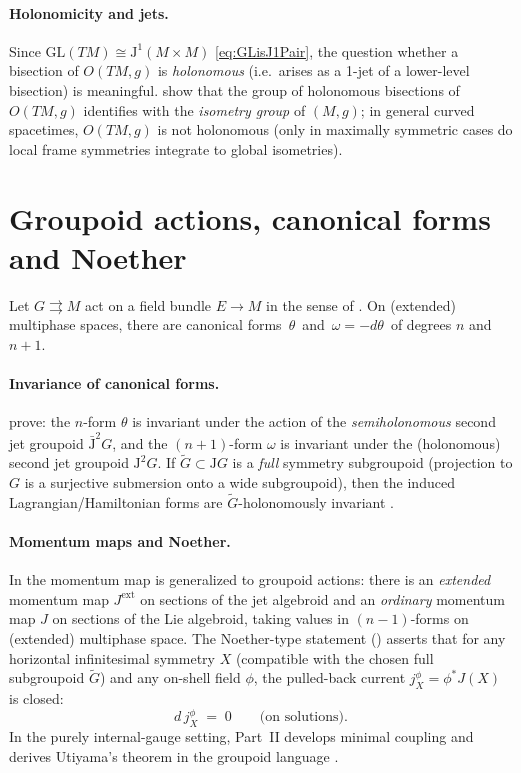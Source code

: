 \documentclass[11pt]{article}
\newcommand{\GL}{\mathrm{GL}}
\newcommand{\JJ}{\mathrm{J}}
\begin{document}
\paragraph{Holonomicity and jets.}
Since $\GL(TM)\cong \JJ^1(M\times M)$ \eqref{eq:GLisJ1Pair}, the question whether a bisection of $O(TM,g)$ is \emph{holonomous} (i.e.\ arises as a 1-jet of a lower-level bisection) is meaningful. \citet[\S3.2, Ex.~4]{CostaA2015} show that the group of holonomous bisections of $O(TM,g)$ identifies with the \emph{isometry group} of $(M,g)$; in general curved spacetimes, $O(TM,g)$ is not holonomous (only in maximally symmetric cases do local frame symmetries integrate to global isometries).

\section{Groupoid actions, canonical forms and Noether}
Let $G\rightrightarrows M$ act on a field bundle $E\to M$ in the sense of \citep[\S4]{CostaA2015}. On (extended) multiphase spaces, there are canonical forms $\,\theta\,$ and $\,\omega=-d\theta\,$ of degrees $n$ and $n\!+\!1$. 

\paragraph{Invariance of canonical forms.}
\citet[Thm.~1, \S4]{CostaA2015} prove: the $n$-form $\theta$ is invariant under the action of the \emph{semiholonomous} second jet groupoid $\bar{\JJ}^2G$, and the $(n\!+\!1)$-form $\omega$ is invariant under the (holonomous) second jet groupoid $\JJ^2G$. If $\tilde G\subset \JJ G$ is a \emph{full} symmetry subgroupoid (projection to $G$ is a surjective submersion onto a wide subgroupoid), then the induced Lagrangian/Hamiltonian forms are $\tilde G$-holonomously invariant \citep[Thm.~2, p.~32]{CostaA2015}.

\paragraph{Momentum maps and Noether.}
In \citet[\S5]{CostaA2015} the momentum map is generalized to groupoid actions: there is an \emph{extended} momentum map $J^{\mathrm{ext}}$ on sections of the jet algebroid and an \emph{ordinary} momentum map $J$ on sections of the Lie algebroid, taking values in $(n\!-\!1)$-forms on (extended) multiphase space. The Noether-type statement (\citealt[Thm.~3]{CostaA2015}) asserts that for any horizontal infinitesimal symmetry $X$ (compatible with the chosen full subgroupoid $\tilde G$) and any on-shell field $\phi$, the pulled-back current $j_X^\phi=\phi^\ast J(X)$ is closed:
\begin{equation}
  d\,j_X^\phi \;=\; 0\qquad\text{(on solutions).}
\end{equation}
In the purely internal-gauge setting, Part~II develops minimal coupling and derives Utiyama's theorem in the groupoid language \citep{CostaB2018}.
\end{document}
